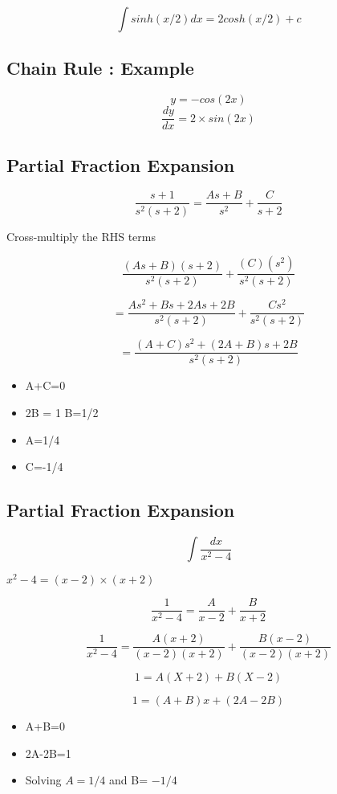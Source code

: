 \documentclass[12pt, a4paper]{article}
\begin{document}
\[ \int sinh(x/2) dx = 2cosh(x/2) + c\]
\subsection*{Chain Rule : Example}
\[ y= -cos(2x) \]
\[ \frac{dy}{dx}= 2\times sin(2x) \]


\subsection*{Partial Fraction Expansion}

\[ \frac{s+1}{s^2(s+2)} = \frac{As+B}{s^2} + \frac{C}{s+2}\]

Cross-multiply the RHS terms


\[ \frac{(As+B)(s+2)}{s^2(s+2)} + \frac{(C)(s^2)}{s^2(s+2)} \]


\[  = \frac{As^2+Bs +2As +2B}{s^2(s+2)} + \frac{Cs^2}{s^2(s+2)} \]


\[  = \frac{(A+C)s^2+(2A+B)s +2B}{s^2(s+2)} \]

\begin{itemize}\item A+C=0
\item 2B = 1 B=1/2
\item A=1/4
\item C=-1/4
\end{itemize}


\subsection{Partial Fraction Expansion}

\[ \int \frac{dx}{x^2-4} \]

$x^2-4 = (x-2)\times(x+2)$

\[ \frac{1}{x^2-4} = \frac{A}{x-2} + \frac{B}{x+2}  \]

\[ \frac{1}{x^2-4} = \frac{A(x+2)}{(x-2)(x+2)} + \frac{B(x-2)}{(x-2)(x+2)}  \]

\[ 1 = A(X+2) +  B(X-2)  \]

\[ 1 = (A+B)x +  (2A-2B)  \]

\begin{itemize} \item A+B=0
\item 2A-2B=1
\item Solving $A=1/4$ and B= $-1/4$
\end{itemize}
\end{document}
